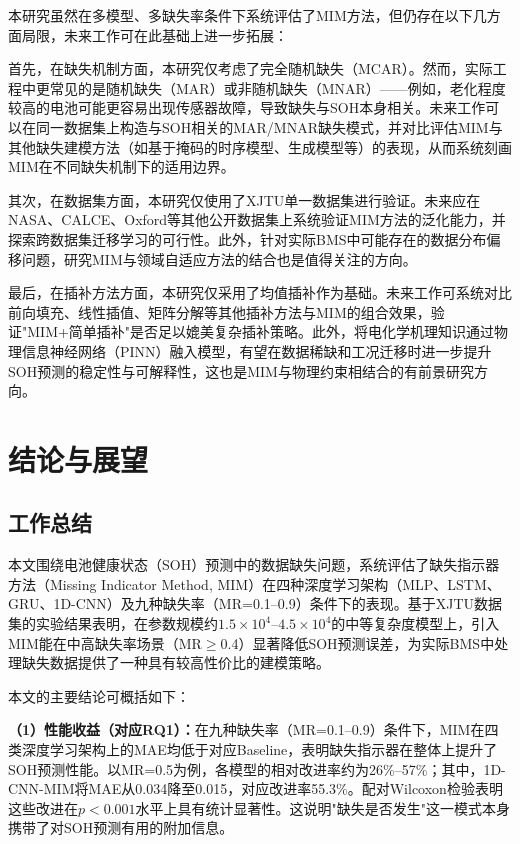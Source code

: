 \documentclass[10pt,a4paper]{ctexart}
\begin{document}
本研究虽然在多模型、多缺失率条件下系统评估了MIM方法，但仍存在以下几方面局限，未来工作可在此基础上进一步拓展：

首先，在缺失机制方面，本研究仅考虑了完全随机缺失（MCAR）。然而，实际工程中更常见的是随机缺失（MAR）或非随机缺失（MNAR）——例如，老化程度较高的电池可能更容易出现传感器故障，导致缺失与SOH本身相关。未来工作可以在同一数据集上构造与SOH相关的MAR/MNAR缺失模式，并对比评估MIM与其他缺失建模方法（如基于掩码的时序模型、生成模型等）的表现，从而系统刻画MIM在不同缺失机制下的适用边界。

其次，在数据集方面，本研究仅使用了XJTU单一数据集进行验证。未来应在NASA、CALCE、Oxford等其他公开数据集上系统验证MIM方法的泛化能力，并探索跨数据集迁移学习的可行性。此外，针对实际BMS中可能存在的数据分布偏移问题，研究MIM与领域自适应方法的结合也是值得关注的方向。

最后，在插补方法方面，本研究仅采用了均值插补作为基础。未来工作可系统对比前向填充、线性插值、矩阵分解等其他插补方法与MIM的组合效果，验证"MIM+简单插补"是否足以媲美复杂插补策略。此外，将电化学机理知识通过物理信息神经网络（PINN）融入模型，有望在数据稀缺和工况迁移时进一步提升SOH预测的稳定性与可解释性\cite{wang2024pinn}，这也是MIM与物理约束相结合的有前景研究方向。

\section{结论与展望}\label{sec:conclusion}

\subsection{工作总结}

本文围绕电池健康状态（SOH）预测中的数据缺失问题，系统评估了缺失指示器方法（Missing Indicator Method, MIM）在四种深度学习架构（MLP、LSTM、GRU、1D-CNN）及九种缺失率（MR=0.1--0.9）条件下的表现。基于XJTU数据集的实验结果表明，在参数规模约$1.5\times 10^4$--$4.5\times 10^4$的中等复杂度模型上，引入MIM能在中高缺失率场景（MR$\geq$0.4）显著降低SOH预测误差，为实际BMS中处理缺失数据提供了一种具有较高性价比的建模策略。

本文的主要结论可概括如下：

\textbf{（1）性能收益（对应RQ1）：}在九种缺失率（MR=0.1--0.9）条件下，MIM在四类深度学习架构上的MAE均低于对应Baseline，表明缺失指示器在整体上提升了SOH预测性能。以MR=0.5为例，各模型的相对改进率约为26\%--57\%；其中，1D-CNN-MIM将MAE从0.034降至0.015，对应改进率55.3\%。配对Wilcoxon检验表明这些改进在$p<0.001$水平上具有统计显著性。这说明"缺失是否发生"这一模式本身携带了对SOH预测有用的附加信息。
\end{document}
